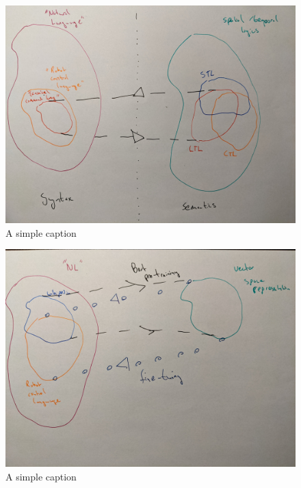 \documentclass[a4paper, 11pt]{article}
\begin{document}
\begin{figure}[ht!]
\centering
\includegraphics[width=150mm]{pics/one.jpg}
\caption{A simple caption \label{overflow}}
\end{figure}

\begin{figure}[ht!]
\centering
\includegraphics[width=150mm]{pics/two.jpg}
\caption{A simple caption \label{overflow}}
\end{figure}
\end{document}
